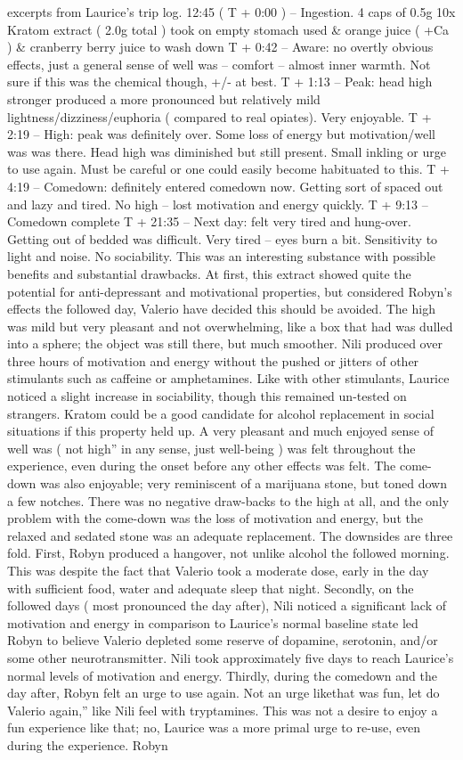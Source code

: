 \documentclass[12pt]{book}
\begin{document}
excerpts from Laurice's trip log. 12:45 ( T + 0:00 ) -- Ingestion. 4 caps of 0.5g 10x Kratom extract ( 2.0g total ) took on empty stomach used  \&  orange juice ( +Ca ) \& cranberry berry juice to wash down T + 0:42 -- Aware: no overtly obvious effects, just a general sense of well was -- comfort -- almost inner warmth. Not sure if this was the chemical though, +/- at best. T + 1:13 -- Peak: head high stronger produced a more pronounced but relatively mild lightness/dizziness/euphoria ( compared to real opiates). Very enjoyable. T + 2:19 -- High: peak was definitely over. Some loss of energy but motivation/well was was there. Head high was diminished but still present. Small inkling or urge to use again. Must be careful or one could easily become habituated to this. T + 4:19 -- Comedown: definitely entered comedown now. Getting sort of spaced out and lazy and tired. No high -- lost motivation and energy quickly. T + 9:13 -- Comedown complete T + 21:35 -- Next day: felt very tired and hung-over. Getting out of bedded was difficult. Very tired -- eyes burn a bit. Sensitivity to light and noise. No sociability. This was an interesting substance with possible benefits and substantial drawbacks. At first, this extract showed quite the potential for anti-depressant and motivational properties, but considered Robyn's effects the followed day, Valerio have decided this should be avoided. The high was mild but very pleasant and not overwhelming, like a box that had was dulled into a sphere; the object was still there, but much smoother. Nili produced over three hours of motivation and energy without the pushed or jitters of other stimulants such as caffeine or amphetamines. Like with other stimulants, Laurice noticed a slight increase in sociability, though this remained un-tested on strangers. Kratom could be a good candidate for alcohol replacement in social situations if this property held up. A very pleasant and much enjoyed sense of well was ( not high'' in any sense, just well-being ) was felt throughout the experience, even during the onset before any other effects was felt. The come-down was also enjoyable; very reminiscent of a marijuana stone, but toned down a few notches. There was no negative draw-backs to the high at all, and the only problem with the come-down was the loss of motivation and energy, but the relaxed and sedated stone was an adequate replacement. The downsides are three fold. First, Robyn produced a hangover, not unlike alcohol the followed morning. This was despite the fact that Valerio took a moderate dose, early in the day with sufficient food, water and adequate sleep that night. Secondly, on the followed days ( most pronounced the day after), Nili noticed a significant lack of motivation and energy in comparison to Laurice's normal baseline state led Robyn to believe Valerio depleted some reserve of dopamine, serotonin, and/or some other neurotransmitter. Nili took approximately five days to reach Laurice's normal levels of motivation and energy. Thirdly, during the comedown and the day after, Robyn felt an urge to use again. Not an urge likethat was fun, let do Valerio again,'' like Nili feel with tryptamines. This was not a desire to enjoy a fun experience like that; no, Laurice was a more primal urge to re-use, even during the experience. Robyn 
\end{document}
